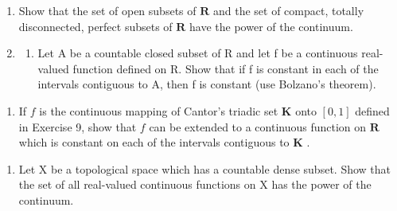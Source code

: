 \begin{enumerate}
\def\labelenumi{\arabic{enumi})}
\setcounter{enumi}{14}
\item
  Show that the set of open subsets of \(\mathbf{R}\) and the set of compact, totally disconnected, perfect subsets of \(\mathbf{R}\) have the power of the continuum.
\item
  \begin{enumerate}
  \def\labelenumii{\alph{enumii})}
  \tightlist
  \item
    Let A be a countable closed subset of R and let f be a continuous real-valued function defined on R. Show that if f is constant in each of the intervals contiguous to A, then f is constant (use Bolzano's theorem).
  \end{enumerate}
\end{enumerate}

\begin{enumerate}
\def\labelenumi{\alph{enumi})}
\setcounter{enumi}{1}
\tightlist
\item
  If \(f\) is the continuous mapping of Cantor's triadic set \(\mathbf{K}\) onto \([0, 1]\) defined in Exercise 9, show that \(f\) can be extended to a continuous function on \(\mathbf{R}\) which is constant on each of the intervals contiguous to \(\mathbf{K}\) .
\end{enumerate}

\begin{enumerate}
\def\labelenumi{\arabic{enumi})}
\setcounter{enumi}{16}
\tightlist
\item
  Let X be a topological space which has a countable dense subset. Show that the set of all real-valued continuous functions on X has the power of the continuum.
\end{enumerate}
